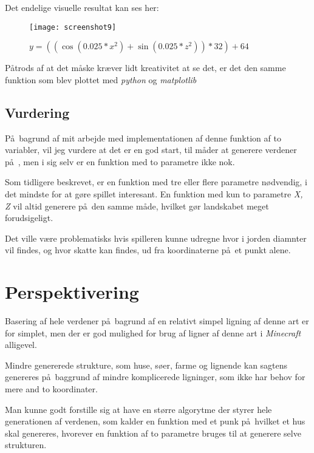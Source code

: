 \documentclass[a4paper,12pt]{report}
\begin{document}
			Det endelige visuelle resultat kan ses her:

			\begin{figure}[h]
				\texttt{[image: screenshot9]}
				\caption{\(y = ((\cos (0.025 * x^2) + \sin (0.025 * z^2)) * 32) + 64\)}
			\end{figure}

			P\aa trods af at det m\aa ske kr\ae ver lidt kreativitet at se det, er det den samme funktion som blev
			plottet med \emph{python} og \emph{matplotlib}
	\section{Vurdering}
		P\aa \ bagrund af mit arbejde med implementationen af denne funktion af to variabler, vil jeg vurdere
		at det er en god start, til m\aa der at generere verdener p\aa \ , men i sig selv er en funktion med to parametre ikke nok.

		Som tidligere beskrevet, er en funktion med tre eller flere parametre n\o dvendig, i det mindste for at g\o re spillet interesant.
		En funktion med kun to parametre \emph{X, Z} vil altid generere p\aa \ den samme m\aa de, hvilket g\o r landskabet
		meget forudsigeligt.

		Det ville v\ae re problematisks hvis spilleren kunne udregne hvor i jorden diamnter vil findes, og hvor skatte kan findes, ud fra
		koordinaterne p\aa \ et punkt alene.
	\chapter{Perspektivering}
		Basering af hele verdener p\aa \ bagrund af en relativt simpel ligning af denne art er for simplet, men
		der er god mulighed for brug af ligner af denne art i \emph{Minecraft} alligevel.

		Mindre genererede strukture, som huse, s\o er, farme og lignende kan sagtens genereres p\aa \ baggrund af
		mindre komplicerede ligninger, som ikke har behov for mere and to koordinater.

		Man kunne godt forstille sig at have en st\o rre algorytme der styrer hele generationen af verdenen,
		som kalder en funktion med et punk p\aa \ hvilket et hus skal genereres, hvorever en funktion af
		to parametre bruges til at generere selve strukturen.
\end{document}

